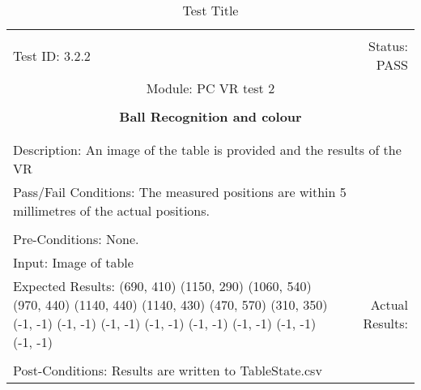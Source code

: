 \documentclass[titlepage]{article}
\begin{document}
\begin{center}%
\begin{table}
\begin{tabular}{|l r|}\hline&\\[-2mm]
	Test ID: 3.2.2	&Status: PASS\\[-3mm]
	\multicolumn{2}{|c|}{Module: PC VR test 2}\\&\\
	\multicolumn{2}{|c|}{\textbf{\large{Ball Recognition and colour}}}\\&\\\hline&\\[-3mm]
	\multicolumn{2}{|p{\textwidth}|}{Description: An image of the table is provided and the results of the VR }\\\hline
	\multicolumn{2}{|p{\textwidth}|}{Pass/Fail Conditions: The measured positions are within 5 millimetres of the actual positions.}\\[1mm]\hline&\\[-3mm]
	\multicolumn{2}{|p{\textwidth}|}{Pre-Conditions: None.}\\[4mm]
	\multicolumn{2}{|p{\textwidth}|}{Input: Image of table}\\[2mm]\hline
	\multicolumn{1}{|p{0.49\textwidth}}{Expected Results:\newline
(690, 410)\newline
(1150, 290)\newline
(1060, 540)\newline
(970, 440)\newline
(1140, 440)\newline
(1140, 430)\newline
(470, 570)\newline
(310, 350)\newline
(-1, -1)\newline
(-1, -1)\newline
(-1, -1)\newline
(-1, -1)\newline
(-1, -1)\newline
(-1, -1)\newline
(-1, -1)\newline
(-1, -1)\newline}	&\multicolumn{1}{|p{0.45\textwidth}|}{Actual Results:}\\\hline&\\[-3mm]
	\multicolumn{2}{|p{\textwidth}|}{Post-Conditions: Results are written to TableState.csv}\\\hline
\end{tabular}
\caption{Test Title}
\end{table}
\end{center}
\end{document}
